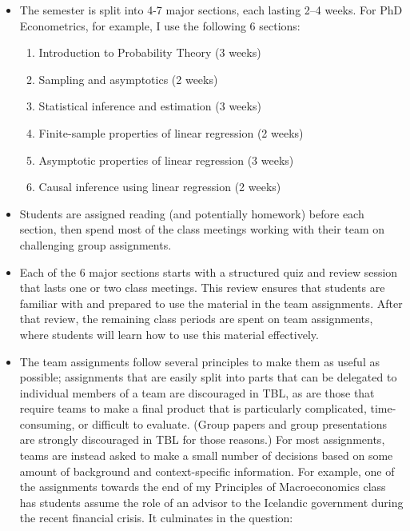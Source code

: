 \documentclass[12pt]{article}%
\begin{document}
\begin{itemize}
\item The semester is split into 4-7 major sections, each lasting 2--4
  weeks. For PhD Econometrics, for example, I use the following 6
  sections:
  \begin{enumerate}
  \item Introduction to Probability Theory (3 weeks)
  \item Sampling and asymptotics (2 weeks)
  \item Statistical inference and estimation (3 weeks)
  \item Finite-sample properties of linear regression (2 weeks)
  \item Asymptotic properties of linear regression (3 weeks)
  \item Causal inference using linear regression (2 weeks)
  \end{enumerate}

\item Students are assigned reading (and potentially homework) before
  each section, then spend most of the class meetings working with
  their team on challenging group assignments.

\item Each of the 6 major sections starts with a structured quiz and
  review session that lasts one or two class meetings. This review
  ensures that students are familiar with and prepared to use the
  material in the team assignments. After that review, the remaining
  class periods are spent on team assignments, where students will
  learn how to use this material effectively.

\item The team assignments follow several principles to make them as
  useful as possible; assignments that are easily split into parts
  that can be delegated to individual members of a team are
  discouraged in TBL, as are those that require teams to make a final
  product that is particularly complicated, time-consuming, or
  difficult to evaluate. (Group papers and group presentations are
  strongly discouraged in TBL for those reasons.) For most
  assignments, teams are instead asked to make a small number of
  decisions based on some amount of background and context-specific
  information. For example, one of the assignments towards the end of
  my Principles of Macroeconomics class has students assume the role
  of an advisor to the Icelandic government during the recent
  financial crisis. It culminates in the question:


\end{itemize}
\end{document}
